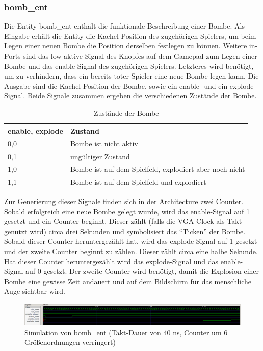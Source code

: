 \documentclass[parskip=full]{scrartcl}
\begin{document}
				\subsubsection{bomb\_ent}
					Die Entity bomb\_ent enthält die funktionale Beschreibung einer Bombe. Als Eingabe erhält die Entity die Kachel-Position des zugehörigen Spielers, um beim Legen einer neuen Bombe die Position derselben festlegen zu können. Weitere in-Ports sind das low-aktive Signal des Knopfes auf dem Gamepad zum Legen einer Bombe und das enable-Signal des zugehörigen Spielers. Letzteres wird benötigt, um zu verhindern, dass ein bereits toter Spieler eine neue Bombe legen kann.
					Die Ausgabe sind die Kachel-Position der Bombe, sowie ein enable- und ein explode-Signal. Beide Signale zusammen ergeben die verschiedenen Zustände der Bombe.
					\begin{table}[H]
						\centering
						\label{bombCode}
						\begin{tabular}{|l|l|}
							\hline
							\textbf{enable, explode} & \textbf{Zustand}      \\ \hline
							0,0         & Bombe ist nicht aktiv              \\ \hline
							0,1           & ungültiger Zustand               \\ \hline
							1,0          & Bombe ist auf dem Spielfeld, explodiert aber noch nicht \\ \hline
							1,1          & Bombe ist auf dem Spielfeld und explodiert     \\ \hline
						\end{tabular}
						\caption{Zustände der Bombe}
					\end{table}
					Zur Generierung dieser Signale finden sich in der Architecture zwei Counter. Sobald erfolgreich eine neue Bombe gelegt wurde, wird das enable-Signal auf 1 gesetzt und ein Counter beginnt. Dieser zählt (falls die VGA-Clock als Takt genutzt wird) circa drei Sekunden und symbolisiert das \enquote{Ticken} der Bombe. Sobald dieser Counter heruntergezählt hat, wird das explode-Signal auf 1 gesetzt und der zweite Counter beginnt zu zählen. Dieser zählt circa eine halbe Sekunde. Hat dieser Counter heruntergezählt wird das explode-Signal und das enable-Signal auf 0 gesetzt. Der zweite Counter wird benötigt, damit die Explosion einer Bombe eine gewisse Zeit andauert und auf dem Bildschirm für das menschliche Auge sichtbar wird.
					\begin{figure}[H]
						\centering
						\includegraphics[scale=0.4]{./bilder/bomb_sim.png}
						\caption{Simulation von bomb\_ent \newline(Takt-Dauer von 40 ns, Counter um 6 Größenordnungen verringert)}
					\end{figure}
			
\end{document}
